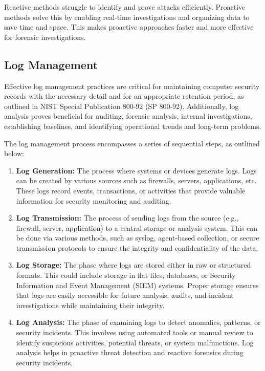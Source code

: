 Reactive methods struggle to identify and prove attacks efficiently. Proactive methods solve this by enabling real-time investigations and organizing data to save time and space. This makes proactive approaches faster and more effective for forensic investigations\cite{SPNFFb16}.
\subsection{Log Management} Effective log management practices are critical for maintaining computer security records with the necessary detail and for an appropriate retention period, as outlined in NIST Special Publication 800-92 (SP 800-92). Additionally, log analysis proves beneficial for auditing, 
forensic analysis, internal investigations, establishing baselines, and identifying operational trends and long-term problems. \cite{kentnist800922006guide}

The log management process encompasses a series of sequential steps, as outlined below:
\begin{enumerate}
\item \textbf{Log Generation:} The process where systems or devices generate logs. Logs can be created by various sources such as firewalls, servers, applications, etc. These logs record events, transactions, or activities that provide valuable information for security monitoring and auditing.

    \item \textbf{Log Transmission:} The process of sending logs from the source (e.g., firewall, server, application) to a central storage or analysis system. This can be done via various methods, such as syslog, agent-based collection, or secure transmission protocols to ensure the integrity and confidentiality of the data.

    \item \textbf{Log Storage:} The phase where logs are stored either in raw or structured formats. This could include storage in flat files, databases, or Security Information and Event Management (SIEM) systems. Proper storage ensures that logs are easily accessible for future analysis, audits, and incident investigations while maintaining their integrity.

    \item \textbf{Log Analysis:} The phase of examining logs to detect anomalies, patterns, or security incidents. This involves using automated tools or manual review to identify suspicious activities, potential threats, or system malfunctions. Log analysis helps in proactive threat detection and reactive forensics during security incidents.
\end{enumerate}

